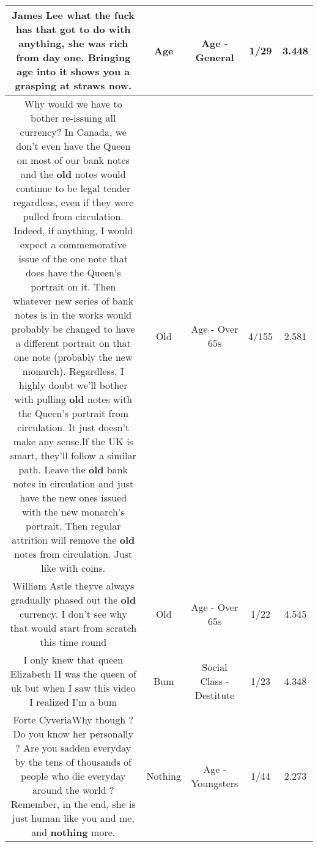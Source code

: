 \documentclass[11pt]{article}
\newlength\mylength
\begin{document}
\begin{center}
\begin{longtable}{|C{.65\mylength}|C{.30\mylength}|C{.12\mylength}|C{.12\mylength}|C{.12\mylength}|}
  \small James Lee what the fuck has that got to do with anything, she was rich from day one. Bringing \textbf{age} into it shows you a grasping at straws now.\normalsize   & Age & Age - General & 1/29 & 3.448 \\  \hline
  \small Why would we have to bother re-issuing all currency? In Canada, we don't even have the Queen on most of our bank notes and the \textbf{old} notes would continue to be legal tender regardless, even if they were pulled from circulation. Indeed, if anything, I would expect a commemorative issue of the one note that does have the Queen's portrait on it. Then whatever new series of bank notes is in the works would probably be changed to have a different portrait on that one note (probably the new monarch). Regardless, I highly doubt we'll bother with pulling \textbf{old} notes with the Queen's portrait from circulation. It just doesn't make any sense.If the UK is smart, they'll follow a similar path. Leave the \textbf{old} bank notes in circulation and just have the new ones issued with the new monarch's portrait. Then regular attrition will remove the \textbf{old} notes from circulation. Just like with coins.\normalsize   & Old & Age - Over 65s & 4/155 & 2.581 \\  \hline
  \small William Astle theyve always gradually phased out the \textbf{old} currency. I don't see why that would start from scratch this time round\normalsize   & Old & Age - Over 65s & 1/22 & 4.545 \\  \hline
  \small I only knew that queen Elizabeth II was the queen of uk but when I saw this video I realized I'm a bum\normalsize   & Bum & Social Class - Destitute & 1/23 & 4.348 \\  \hline
  \small Forte CyveriaWhy though ? Do you know her personally ? Are you sadden everyday by the tens of thousands of people who die everyday around the world ? Remember, in the end, she is just human like you and me, and \textbf{nothing} more.\normalsize   & Nothing & Age - Youngsters & 1/44 & 2.273 \\  \hline

\end{longtable}
\end{center}
\end{document}
